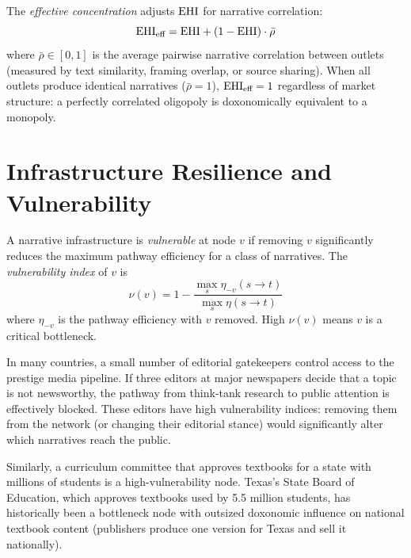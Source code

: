 \begin{definition}
\label{def:effective-concentration}
The \emph{effective concentration} adjusts $\mathrm{EHI}$ for narrative correlation:
\[
  \mathrm{EHI}_{\text{eff}} = \mathrm{EHI} + (1 - \mathrm{EHI}) \cdot \bar{\rho}
\]
where $\bar{\rho} \in [0,1]$ is the average pairwise narrative correlation between outlets (measured by text similarity, framing overlap, or source sharing).
When all outlets produce identical narratives ($\bar{\rho} = 1$), $\mathrm{EHI}_{\text{eff}} = 1$ regardless of market structure: a perfectly correlated oligopoly is doxonomically equivalent to a monopoly.
\end{definition}


\section{Infrastructure Resilience and Vulnerability}
\label{sec:ch7-resilience}

\begin{definition}
\label{def:vulnerability}
A narrative infrastructure is \emph{vulnerable} at node $v$ if removing $v$ significantly reduces the maximum pathway efficiency for a class of narratives.
The \emph{vulnerability index} of $v$ is
\[
  \nu(v) = 1 - \frac{\max_s \eta_{-v}(s \to t)}{\max_s \eta(s \to t)}
\]
where $\eta_{-v}$ is the pathway efficiency with $v$ removed.
High $\nu(v)$ means $v$ is a critical bottleneck.
\end{definition}

\begin{example}
\label{ex:bottleneck}
In many countries, a small number of editorial gatekeepers control access to the prestige media pipeline.
If three editors at major newspapers decide that a topic is not newsworthy, the pathway from think-tank research to public attention is effectively blocked.
These editors have high vulnerability indices: removing them from the network (or changing their editorial stance) would significantly alter which narratives reach the public.

Similarly, a curriculum committee that approves textbooks for a state with millions of students is a high-vulnerability node.
Texas's State Board of Education, which approves textbooks used by 5.5 million students, has historically been a bottleneck node with outsized doxonomic influence on national textbook content (publishers produce one version for Texas and sell it nationally).
\end{example}

